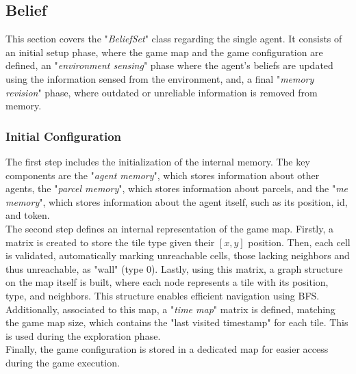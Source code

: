     \subsection{Belief}
        This section covers the "\textit{BeliefSet}" class regarding the single agent. It consists of an initial setup phase, where the game map and the game configuration are defined, an "\textit{environment sensing}" phase where the agent's beliefs are updated using the information sensed from the environment, and, a final "\textit{memory revision}" phase, where outdated or unreliable information is removed from memory.

        \subsubsection{Initial Configuration}
            The first step includes the initialization of the internal memory. The key components are the "\textit{agent memory}", which stores information about other agents, the "\textit{parcel memory}", which stores information about parcels, and the "\textit{me memory}", which stores information about the agent itself, such as its position, id, and token.
            \medskip\\
            The second step defines an internal representation of the game map. Firstly, a matrix is created to store the tile type given their $[x, y]$ position. Then, each cell is validated, automatically marking unreachable cells, those lacking neighbors and thus unreachable, as "wall" (type $0$). Lastly, using this matrix, a graph structure on the map itself is built, where each node represents a tile with its position, type, and neighbors. This structure enables efficient navigation using BFS. Additionally, associated to this map, a "\textit{time map}" matrix is defined, matching the game map size, which contains the "last visited timestamp" for each tile. This is used during the exploration phase.
            \medskip\\
            Finally, the game configuration is stored in a dedicated map for easier access during the game execution.

